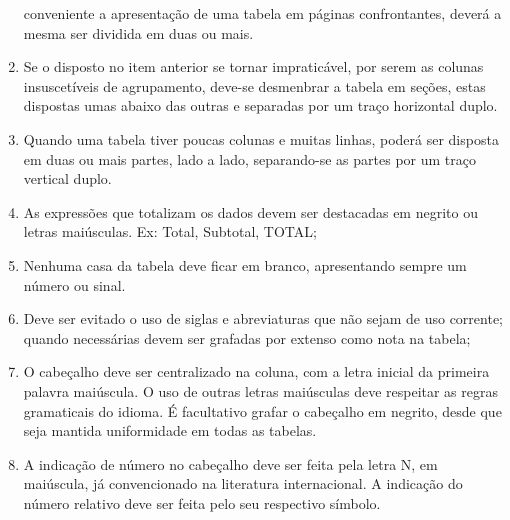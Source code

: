 \begin{enumerate}
conveniente a apresentação de uma tabela em páginas confrontantes,
deverá a mesma ser dividida em duas ou mais. 
\item Se o disposto
no item anterior se tornar impraticável, por serem as colunas
insuscetíveis de agrupamento, deve-se desmenbrar a tabela em
seções, estas dispostas umas abaixo das outras e separadas por um traço horizontal duplo. 
\item Quando uma tabela tiver poucas
colunas e muitas linhas, poderá ser disposta em duas ou mais
partes, lado a lado, separando-se as partes por um traço vertical
duplo.
\item As expressões que totalizam os dados devem ser destacadas em negrito ou letras maiúsculas. Ex: Total, Subtotal, TOTAL;
\item Nenhuma casa da tabela deve ficar em branco, apresentando sempre um número ou sinal.
\item Deve ser evitado o uso de siglas e abreviaturas que não sejam de uso corrente; quando necessárias devem ser grafadas por extenso como nota na tabela;
\item O cabeçalho deve ser centralizado na coluna, com a letra inicial da primeira palavra maiúscula. O uso de outras letras maiúsculas deve respeitar as regras gramaticais do idioma. É facultativo grafar o cabeçalho em negrito, desde que seja mantida uniformidade em todas as tabelas.
\item A indicação de número no cabeçalho deve ser feita pela letra N, em maiúscula, já convencionado na literatura internacional. A indicação do número relativo deve ser feita pelo seu respectivo símbolo.
\end{enumerate}






